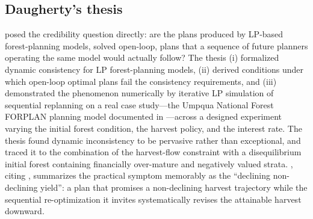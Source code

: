 \hypertarget{daughertys-thesis}{%
\subsection{Daugherty's thesis}\label{daughertys-thesis}}

\citet{daugherty1991credibility} posed the credibility question directly: are the plans produced by LP-based forest-planning models, solved open-loop, plans that a sequence of future planners operating the same model would actually follow? The thesis (i) formalized dynamic consistency for LP forest-planning models, (ii) derived conditions under which open-loop optimal plans fail the consistency requirements, and (iii) demonstrated the phenomenon numerically by iterative LP simulation of sequential replanning on a real case study---the Umpqua National Forest FORPLAN planning model documented in \citep{usda1987umpqua}---across a designed experiment varying the initial forest condition, the harvest policy, and the interest rate. The thesis found dynamic inconsistency to be pervasive rather than exceptional, and traced it to the combination of the harvest-flow constraint with a disequilibrium initial forest containing financially over-mature and negatively valued strata. \citet[pp.~331--332]{gunn2007models}, citing \citet{daugherty1991credibility}, summarizes the practical symptom memorably as the ``declining non-declining yield'': a plan that promises a non-declining harvest trajectory while the sequential re-optimization it invites systematically revises the attainable harvest downward.
